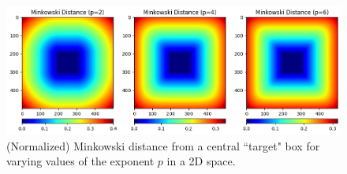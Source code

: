 \begin{figure}[h]
    \centering
    \includegraphics[width=1\linewidth]{images/minkowski.png}
    \caption{(Normalized) Minkowski distance from a central ``target" box for varying values of the exponent $p$ in a 2D space.}
    \label{fig:minkowski}
\end{figure} 